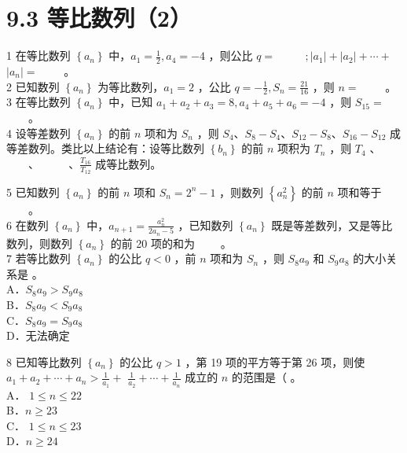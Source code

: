 \documentclass[10pt]{article}
\begin{document}
\section*{9.3 等比数列（2）}
1 在等比数列 \(\left\{a_{n}\right\}\) 中，\(a_{1}=\frac{1}{2}, a_{4}=-4\) ，则公比 \(q=\) \(\qquad\) \(;\left|a_{1}\right|+\left|a_{2}\right|+\cdots+\) \(\left|a_{n}\right|=\) \(\qquad\)。\\
2 已知数列 \(\left\{a_{n}\right\}\) 为等比数列，\(a_{1}=2\) ，公比 \(q=-\frac{1}{2}, S_{n}=\frac{21}{16}\) ，则 \(n=\) \(\qquad\)。\\
3 在等比数列 \(\left\{a_{n}\right\}\) 中，已知 \(a_{1}+a_{2}+a_{3}=8, a_{4}+a_{5}+a_{6}=-4\) ，则 \(S_{15}=\) \(\qquad\)。\\
4 设等差数列 \(\left\{a_{n}\right\}\) 的前 \(n\) 项和为 \(S_{n}\) ，则 \(S_{4} 、 S_{8}-S_{4} 、 S_{12}-S_{8} 、 S_{16}-S_{12}\) 成等差数列。类比以上结论有：设等比数列 \(\left\{b_{n}\right\}\) 的前 \(n\) 项积为 \(T_{n}\) ，则 \(T_{4}\) 、 \(\qquad\)、 \(\qquad\) \(、 \frac{T_{16}}{T_{12}}\) 成等比数列。

5 已知数列 \(\left\{a_{n}\right\}\) 的前 \(n\) 项和 \(S_{n}=2^{n}-1\) ，则数列 \(\left\{a_{n}^{2}\right\}\) 的前 \(n\) 项和等于 \(\qquad\)。\\
6 在数列 \(\left\{a_{n}\right\}\) 中，\(a_{n+1}=\frac{a_{n}^{2}}{2 a_{n}-5}\) ，已知数列 \(\left\{a_{n}\right\}\) 既是等差数列，又是等比数列，则数列 \(\left\{a_{n}\right\}\) 的前 20 项的和为 \(\qquad\)。\\
7 若等比数列 \(\left\{a_{n}\right\}\) 的公比 \(q<0\) ，前 \(n\) 项和为 \(S_{n}\) ，则 \(S_{8} a_{9}\) 和 \(S_{9} a_{8}\) 的大小关系是 。\\
A．\(S_{8} a_{9}>S_{9} a_{8}\)\\
B．\(S_{8} a_{9}<S_{9} a_{8}\)\\
C．\(S_{8} a_{9}=S_{9} a_{8}\)\\
D．无法确定

8 已知等比数列 \(\left\{a_{n}\right\}\) 的公比 \(q>1\) ，第 19 项的平方等于第 26 项，则使 \(a_{1}+a_{2}+\cdots+a_{n}>\frac{1}{a_{1}}+\) \(\frac{1}{a_{2}}+\cdots+\frac{1}{a_{n}}\) 成立的 \(n\) 的范围是（ 。\\
A． \(1 \leqslant n \leqslant 22\)\\
B．\(n \geqslant 23\)\\
C． \(1 \leqslant n \leqslant 23\)\\
D．\(n \geqslant 24\)
\end{document}
